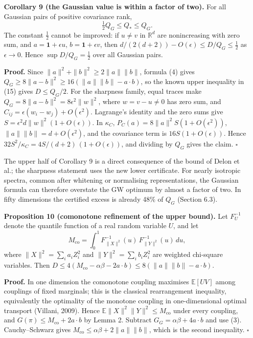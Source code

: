 \documentclass[
  british,
  11pt,
  a4paper,
]{article}
\begin{document}
\textbf{Corollary 9 (the Gaussian value is within a factor of two).} For
all Gaussian pairs of positive covariance rank, \[
\tfrac12Q_G\leq Q_*\leq Q_G.
\] The constant \(\tfrac12\) cannot be improved: if \(u\ne v\) in
\(\mathbb R^d\) are nonincreasing with zero sum, and
\(a=\mathbf 1+\epsilon u\), \(b=\mathbf 1+\epsilon v\), then
\(d/(2(d+2))-O(\epsilon)\leq D/Q_G\leq\tfrac12\) as \(\epsilon\to0\).
Hence \(\sup D/Q_G=\tfrac12\) over all Gaussian pairs.

\textbf{Proof.} Since \(\|a\|^2+\|b\|^2\geq2\|a\|\|b\|\), formula (4)
gives \(Q_G\geq8\|a-b\|^2\geq16(\|a\|\|b\|-a\cdot b)\), so the known
upper inequality in (15) gives \(D\leq Q_G/2\). For the sharpness
family, equal traces make \(Q_G=8\|a-b\|^2=8\epsilon^2\|w\|^2\), where
\(w=v-u\ne0\) has zero sum, and
\(C_{ij}=\epsilon(w_i-w_j)+O(\epsilon^2)\). Lagrange's identity and the
zero sums give \(S=\epsilon^2d\|w\|^2(1+O(\epsilon))\). In \(\kappa_C\),
\(P_C(a)=8\|a\|^2S(1+O(\epsilon^2))\), \(\|a\|\|b\|=d+O(\epsilon^2)\),
and the covariance term is \(16S(1+O(\epsilon))\). Hence
\(32S^2/\kappa_C=4S/(d+2)\,(1+O(\epsilon))\), and dividing by \(Q_G\)
gives the claim. \(\square\)

The upper half of Corollary 9 is a direct consequence of the bound of
Delon et al.; the sharpness statement uses the new lower certificate.
For nearly isotropic spectra, common after whitening or normalising
representations, the Gaussian formula can therefore overstate the GW
optimum by almost a factor of two. In fifty dimensions the certified
excess is already 48\% of \(Q_G\) (Section 6.3).

\textbf{Proposition 10 (comonotone refinement of the upper bound).} Let
\(F_U^{-1}\) denote the quantile function of a real random variable
\(U\), and let \[
M_{\mathrm{co}}=\int_0^1F^{-1}_{\|X\|^2}(u)\,F^{-1}_{\|Y\|^2}(u)\,du,
\] where \(\|X\|^2=\sum_ia_iZ_i^2\) and \(\|Y\|^2=\sum_ib_iZ_i^2\) are
weighted chi-square variables. Then
\(D\leq4(M_{\mathrm{co}}-\alpha\beta-2a\cdot b)\leq8(\|a\|\|b\|-a\cdot b)\).

\textbf{Proof.} In one dimension the comonotone coupling maximises
\(\mathbb E[UV]\) among couplings of fixed marginals; this is the
classical rearrangement inequality, equivalently the optimality of the
monotone coupling in one-dimensional optimal transport (Villani, 2009).
Hence \(\mathbb E\|X\|^2\|Y\|^2\leq M_{\mathrm{co}}\) under every
coupling, and \(G(\pi)\leq M_{\mathrm{co}}+2a\cdot b\) by Lemma 2.
Subtract \(G_G=\alpha\beta+4a\cdot b\) and use (3). Cauchy--Schwarz
gives \(M_{\mathrm{co}}\leq\alpha\beta+2\|a\|\|b\|\), which is the
second inequality. \(\square\)
\end{document}
